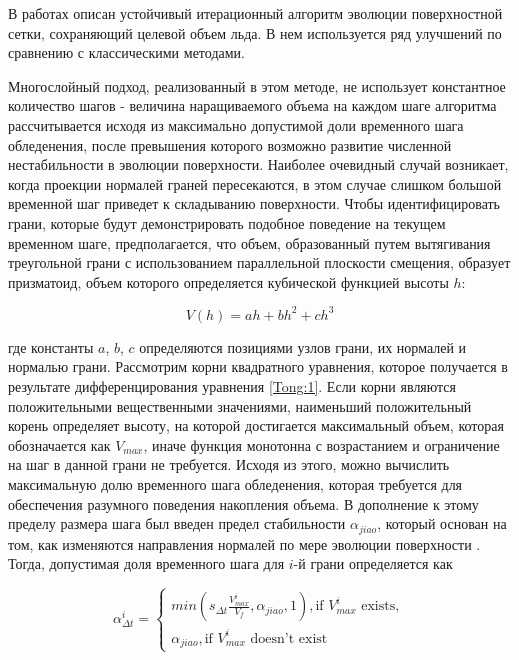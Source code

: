 В работах \cite{Thompson,Tong} описан устойчивый итерационный алгоритм эволюции поверхностной сетки, сохраняющий целевой объем льда.
В нем используется ряд улучшений по сравнению с классическими методами.

Многослойный подход, реализованный в этом методе, не использует константное количество шагов - величина наращиваемого объема на каждом шаге алгоритма рассчитывается исходя из максимально допустимой доли временного шага обледенения, после превышения которого возможно развитие численной нестабильности в эволюции поверхности.
Наиболее очевидный случай возникает, когда проекции нормалей граней пересекаются, в этом случае слишком большой временной шаг приведет к складыванию поверхности.
Чтобы идентифицировать грани, которые будут демонстрировать подобное поведение на текущем временном шаге, предполагается, что объем, образованный путем вытягивания треугольной грани с использованием параллельной плоскости смещения, образует призматоид, объем которого определяется кубической функцией высоты $h$:

\begin{equation}\label{Tong:1}
V(h)=ah+bh^2+ch^3
\end{equation}

где константы $a$, $b$, $c$ определяются позициями узлов грани, их нормалей и нормалью грани.
Рассмотрим корни квадратного уравнения, которое получается в результате дифференцирования уравнения \ref{Tong:1}.
Если корни являются положительными вещественными значениями, наименьший положительный корень определяет высоту, на которой достигается максимальный объем, которая обозначается как $V_{max}$, иначе функция монотонна с возрастанием и ограничение на шаг в данной грани не требуется.
Исходя из этого, можно вычислить максимальную долю временного шага обледенения, которая требуется для обеспечения разумного поведения накопления объема.
В дополнение к этому пределу размера шага был введен предел стабильности $\alpha_{jiao}$, который основан на том, как изменяются направления нормалей по мере эволюции поверхности \cite{Jiao}.
Тогда, допустимая доля временного шага для $i$-й грани определяется как

\begin{equation}\label{Tong:2}
\alpha_{\Delta t}^i=
\begin{cases}
min(s_{\Delta t}\frac{V_{max}^i}{V_f},\alpha_{jiao},1), \text{if $V_{max}^i$ exists}, \\
\alpha_{jiao}, \text{if $V_{max}^i$ doesn't exist}
\end{cases}
\end{equation}


